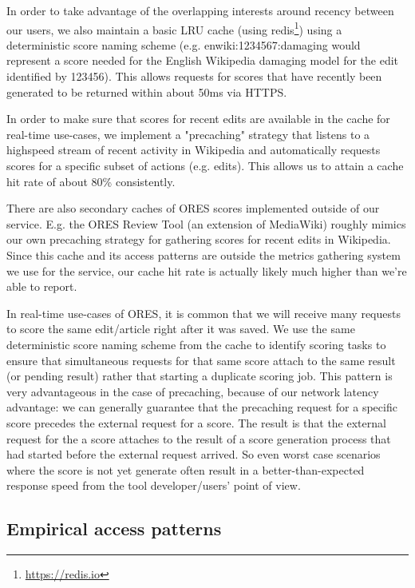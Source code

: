 In order to take advantage of the overlapping interests around recency between our users, we also maintain a basic LRU cache (using redis\footnote{\url{https://redis.io}}) using a deterministic score naming scheme (e.g. enwiki:1234567:damaging would represent a score needed for the English Wikipedia damaging model for the edit identified by 123456).  This allows requests for scores that have recently been generated to be returned within about 50ms via HTTPS.

In order to make sure that scores for recent edits are available in the cache for real-time use-cases, we implement a "precaching" strategy that listens to a highspeed stream of recent activity in Wikipedia and automatically requests scores for a specific subset of actions (e.g. edits).  This allows us to attain a cache hit rate of about 80\% consistently.

There are also secondary caches of ORES scores implemented outside of our service.  E.g. the ORES Review Tool (an extension of MediaWiki) roughly mimics our own precaching strategy for gathering scores for recent edits in Wikipedia.  Since this cache and its access patterns are outside the metrics gathering system we use for the service, our cache hit rate is actually likely much higher than we're able to report.

In real-time use-cases of ORES, it is common that we will receive many requests to score the same edit/article right after it was saved.  We use the same deterministic score naming scheme from the cache to identify scoring tasks to ensure that simultaneous requests for that same score attach to the same result (or pending result) rather that starting a duplicate scoring job.  This pattern is very advantageous in the case of precaching, because of our network latency advantage: we can generally guarantee that the precaching request for a specific score precedes the external request for a score.  The result is that the external request for the a score attaches to the result of a score generation process that had started before the external request arrived.  So even worst case scenarios where the score is not yet generate often result in a better-than-expected response speed from the tool developer/users' point of view.

\subsection{Empirical access patterns}


